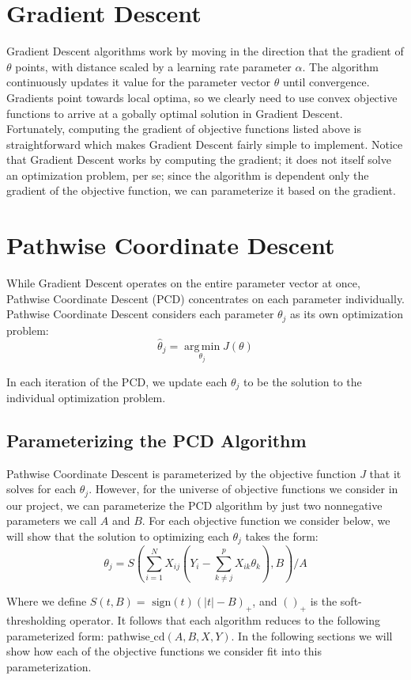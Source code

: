 \documentclass[11pt]{article}
\newcommand{\thh}{\hat{\theta}}
\newcommand{\sgn}{\text{ sign}}
\DeclareMathOperator*{\argmin}{arg\,min}
\begin{document}
\section{Gradient Descent}
Gradient Descent algorithms work by moving in the direction that the gradient of $\theta$ points, with distance scaled by a learning rate parameter $\alpha$.  The algorithm continuously updates it value for the parameter vector $\theta$ until convergence.  Gradients point towards local optima, so we clearly need to use convex objective functions to arrive at a gobally optimal solution in Gradient Descent.  Fortunately, computing the gradient of objective functions listed above is straightforward which makes Gradient Descent fairly simple to implement.  Notice that Gradient Descent works by computing the gradient; it does not itself solve an optimization problem, per se; since the algorithm is dependent only the gradient of the objective function, we can parameterize it based on the gradient.  

\section{Pathwise Coordinate Descent}
While Gradient Descent operates on the entire parameter vector at once, Pathwise Coordinate Descent (PCD) concentrates on each parameter individually.  Pathwise Coordinate Descent considers each parameter $\theta_j$ as its own optimization problem\cite{ht}:
	$$\thh_j = \argmin\limits_{\theta_j} J(\theta)$$

In each iteration of the PCD, we update each $\theta_j$ to be the solution to the individual optimization problem.  

\subsection{Parameterizing the PCD Algorithm}
Pathwise Coordinate Descent is parameterized by the objective function $J$ that it solves for each $\theta_j$.  However, for the universe of objective functions we consider in our project, we can parameterize the PCD algorithm by just two nonnegative parameters we call $A$ and $B$.  For each objective function we consider below, we will show that the solution to optimizing each $\theta_j$ takes the form:
	$$\theta_j = S\left(\sum\limits_{i=1}^N X_{ij}(Y_i - \sum\limits_{k \ne j}^p X_{ik}\theta_k), B\right)/A$$

Where we define\cite{ht} $S(t,B) = \sgn(t)(|t|-B)_+$, and $()_+$ is the soft-thresholding operator.  It follows that each algorithm reduces to the following parameterized form: $\text{pathwise\_cd}(A, B, X, Y)$.  In the following sections we will show how each of the objective functions we consider fit into this parameterization.  
\end{document}
